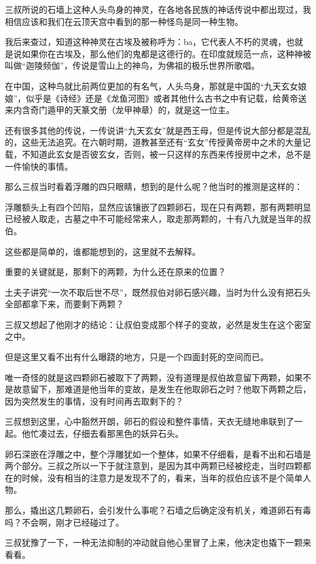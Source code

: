三叔所说的石墙上这种人头鸟身的神灵，在各地各民族的神话传说中都出现过，我相信应该和我们在云顶天宫中看到的那一种怪鸟是同一种生物。

我后来查过，知道这种神灵在古埃及被称呼为：ba，它代表人不朽的灵魂，也就是说如果你在古埃及，那么他们的鬼都是这德行的。在印度就规范一点，这种神被叫做“迦陵频伽”，传说是雪山上的神鸟，为佛祖的极乐世界所歌唱。

在中国，这种鸟就比前两位更加的有名气，人头鸟身，那就是中国的“九天玄女娘娘”，似乎是《诗经》还是《龙鱼河图》或者其他什么古书之中有记载，给黄帝送来内含奇门遁甲的天篆文册（龙甲神章）的，就是这一位主。

还有很多其他的传说，一传说讲“九天玄女”就是西王母，但是传说大部分都是混乱的，这些无法追究。在六朝时期，道教甚至还有“玄女”传授黄帝房中之术的大量记载，不知道此玄女是否彼玄女，否则，被一只这样的东西来传授房中之术，总不是一件愉快的事情。

那么三叔当时看着浮雕的四只眼睛，想到的是什么呢？他当时的推测是这样的：

浮雕额头上有四个凹陷，显然应该镶嵌了四颗卵石，现在只有两颗，那有两颗明显已经被人取走，古墓之中不可能经常来人，取走那两颗的，十有八九就是当年的叔伯。

这些都是简单的，谁都能想到的，这里就不去解释。

重要的关键就是，那剩下的两颗，为什么还在原来的位置？

土夫子讲究“一次不取后世不尽”，既然叔伯对卵石感兴趣，当时为什么没有把石头全部都拿下来，而要剩下两颗？

三叔又想起了他刚才的结论：让叔伯变成那个样子的变故，必然是发生在这个密室之中。

但是这里又看不出有什么曝跷的地方，只是一个四面封死的空间而已。

唯一奇怪的就是这四颗卵石被取下了两颗，没有道理是叔伯故意留下两颗，如果不是故意留下，那难道是他当年的变故，是发生在他取卵石之时？他取下两颗之后，因为突然发生的事情，没有时间再去取剩下的？

三叔想到这里，心中豁然开朗，卵石的假设和整件事情，天衣无缝地串联到了一起。他忙凑过去，仔细去看那黑色的妖异石头。

卵石深嵌在浮雕之中，整个浮雕犹如一个整体，如果不仔细看，是看不出和石墙是两个部分。三叔之所以一下于就注意到，是因为其中两颗已经被挖走，当时四颗都在的时候，没有相当的注意力是发现不了的，看来，当年的叔伯应该不是个简单人物。

那么，撬出这几颗卵石，会引发什么事呢？石墙之后确定没有机关，难道卵石有毒吗？不会啊，刚才已经碰过了。

三叔犹豫了一下，一种无法抑制的冲动就自他心里冒了上来，他决定也撬下一颗来看看。

